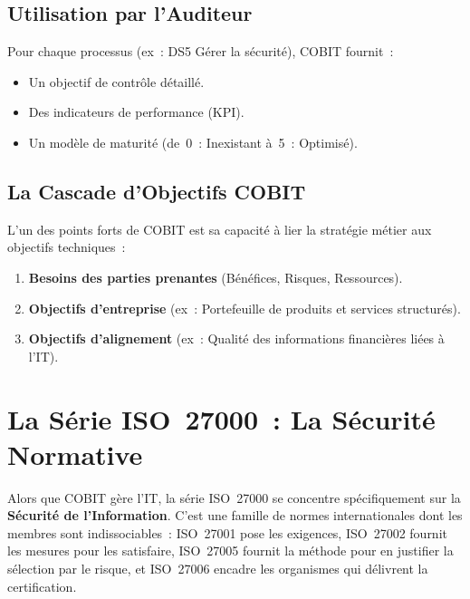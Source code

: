 \subsection{Utilisation par l'Auditeur}

Pour chaque processus (ex~: DS5 \og{}Gérer la sécurité\fg{}), COBIT fournit~:
\begin{itemize}
    \item Un objectif de contrôle détaillé.
    \item Des indicateurs de performance (KPI).
    \item Un modèle de maturité (de~0~: Inexistant à~5~: Optimisé).
\end{itemize}

\subsection{La Cascade d'Objectifs COBIT}

L'un des points forts de COBIT est sa capacité à lier la stratégie métier aux objectifs
techniques~:
\begin{enumerate}
    \item \textbf{Besoins des parties prenantes} (Bénéfices, Risques, Ressources).
    \item \textbf{Objectifs d'entreprise} (ex~: Portefeuille de produits et services structurés).
    \item \textbf{Objectifs d'alignement} (ex~: Qualité des informations financières liées à l'IT).
\end{enumerate}

\section{La Série ISO~27000~: La Sécurité Normative}
\label{sec:iso27000}

Alors que COBIT gère l'IT, la série ISO~27000 se concentre spécifiquement sur la
\textbf{Sécurité de l'Information}. C'est une famille de normes internationales dont
les membres sont indissociables~: ISO~27001 pose les exigences, ISO~27002 fournit
les mesures pour les satisfaire, ISO~27005 fournit la méthode pour en justifier
la sélection par le risque, et ISO~27006 encadre les organismes qui délivrent
la certification.

